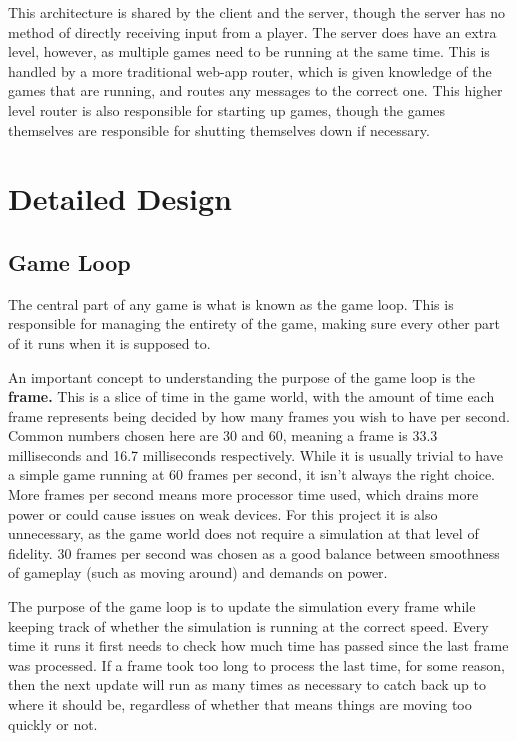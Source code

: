 This architecture is shared by the client and the server, though the server has no method of directly receiving input from a player. The server does have an extra level, however, as multiple games need to be running at the same time. This is handled by a more traditional web-app router, which is given knowledge of the games that are running, and routes any messages to the correct one. This higher level router is also responsible for starting up games, though the games themselves are responsible for shutting themselves down if necessary.


\section{Detailed Design}

\subsection{Game Loop}
The central part of any game is what is known as the game loop. This is responsible for managing the entirety of the game, making sure every other part of it runs when it is supposed to.

An important concept to understanding the purpose of the game loop is the \textbf{frame.} This is a slice of time in the game world, with the amount of time each frame represents being decided by how many frames you wish to have per second. Common numbers chosen here are 30 and 60, meaning a frame is 33.3 milliseconds and 16.7 milliseconds respectively. While it is usually trivial to have a simple game running at 60 frames per second, it isn't always the right choice. More frames per second means more processor time used, which drains more power or could cause issues on weak devices. For this project it is also unnecessary, as the game world does not require a simulation at that level of fidelity. 30 frames per second was chosen as a good balance between smoothness of gameplay (such as moving around) and demands on power.

The purpose of the game loop is to update the simulation every frame while keeping track of whether the simulation is running at the correct speed. Every time it runs it first needs to check how much time has passed since the last frame was processed. If a frame took too long to process the last time, for some reason, then the next update will run as many times as necessary to catch back up to where it should be, regardless of whether that means things are moving too quickly or not.

